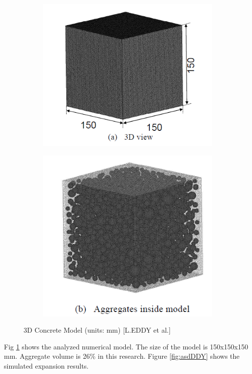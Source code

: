 \begin{itemize}
    \begin{figure}[ht!]
    \centering
    \begin{subfigure}{.5\textwidth}
      \centering
      \includegraphics[width=.9\linewidth]{Files/Background/EDDY_model_1.png}
    \end{subfigure}%
    \begin{subfigure}{.5\textwidth}
      \centering
      \includegraphics[width=.75\linewidth]{Files/Background/EDDY_model_2.png}
    \end{subfigure}
    \caption{3D Concrete Model (units: mm) [L.EDDY et al.\cite{Eddy}]}
    \label{fig:EDDY_model}
    \end{figure}

    Fig \ref{fig:EDDY_model} shows the analyzed numerical model. The size of the model is 150x150x150 mm. Aggregate volume is 26\% in this research. Figure \ref{fig:asdDDY} shows the simulated expansion results.


\end{itemize}

